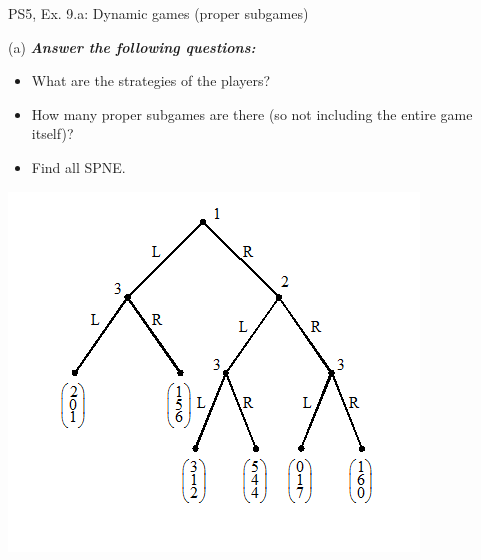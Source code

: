 \begin{frame}{PS5, Ex. 9.a: Dynamic games (proper subgames)}
  \begin{multicols}{2}
    (a) \textbf{\textit{Answer the following questions:}}
    \begin{itemize}
      \item What are the strategies of the players?
      \item How many proper subgames are there (so not including the entire game itself)?
      \item Find all SPNE.
    \end{itemize}
    \vfill\null \columnbreak
    \includegraphics[width=1.2\columnwidth]{figures/Set_5_figure_1}
    \vfill\null
  \end{multicols}
\end{frame}
